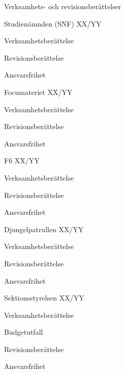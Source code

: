 \documentclass[prelim]{sektionsmote}
\begin{document}
\begin{ootd}
\item{Verksamhets- och revisionsberättelser}
\begin{ootd}
    \item Studienämnden (SNF) XX/YY
    \begin{ootd}
        \item Verksamhetsberättelse
        \item Revisionsberättelse
        \item Ansvarsfrihet
    \end{ootd}
\end{ootd}
\begin{ootd}
    \item Focumateriet XX/YY
    \begin{ootd}
        \item Verksamhetsberättelse
        \item Revisionsberättelse
        \item Ansvarsfrihet
    \end{ootd}
\end{ootd}
\begin{ootd}
    \item F6 XX/YY
    \begin{ootd}
        \item Verksamhetsberättelse
        \item Revisionsberättelse
        \item Ansvarsfrihet
    \end{ootd}
\end{ootd}
\begin{ootd}
    \item Djungelpatrullen XX/YY
    \begin{ootd}
        \item Verksamhetsberättelse
        \item Revisionsberättelse
        \item Ansvarsfrihet
    \end{ootd}
\end{ootd}
\begin{ootd}
    \item Sektionsstyrelsen XX/YY
    \begin{ootd}
        \item Verksamhetsberättelse
        \item Budgetutfall
        \item Revisionsberättelse
        \item Ansvarsfrihet
    \end{ootd}
\end{ootd}


\end{ootd}
\end{document}
